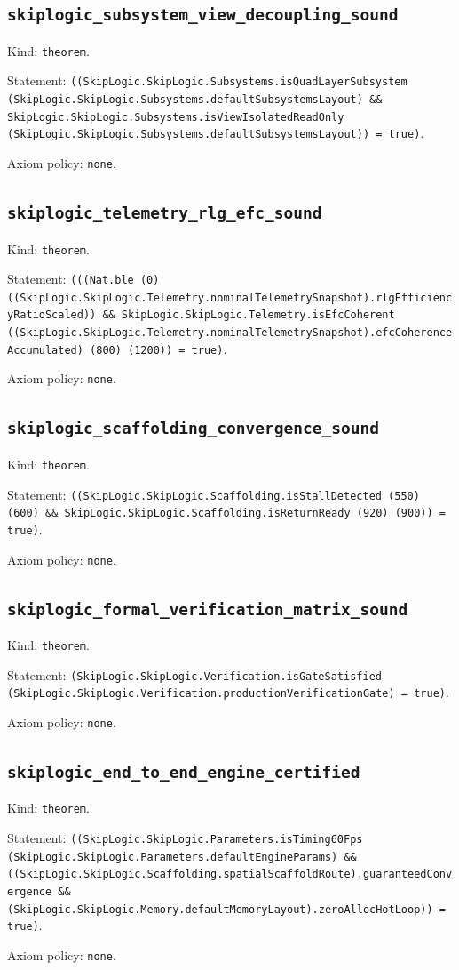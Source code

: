 \documentclass[11pt]{article}
\begin{document}
\subsection*{\texttt{skiplogic\_subsystem\_view\_decoupling\_sound}}
\noindent Kind: \texttt{theorem}.\par
\noindent Statement: \texttt{((SkipLogic.SkipLogic.Subsystems.isQuadLayerSubsystem (SkipLogic.SkipLogic.Subsystems.defaultSubsystemsLayout) \&\& SkipLogic.SkipLogic.Subsystems.isViewIsolatedReadOnly (SkipLogic.SkipLogic.Subsystems.defaultSubsystemsLayout)) = true)}.\par
\noindent Axiom policy: \texttt{none}.\par
\subsection*{\texttt{skiplogic\_telemetry\_rlg\_efc\_sound}}
\noindent Kind: \texttt{theorem}.\par
\noindent Statement: \texttt{(((Nat.ble (0) ((SkipLogic.SkipLogic.Telemetry.nominalTelemetrySnapshot).rlgEfficiencyRatioScaled)) \&\& SkipLogic.SkipLogic.Telemetry.isEfcCoherent ((SkipLogic.SkipLogic.Telemetry.nominalTelemetrySnapshot).efcCoherenceAccumulated) (800) (1200)) = true)}.\par
\noindent Axiom policy: \texttt{none}.\par
\subsection*{\texttt{skiplogic\_scaffolding\_convergence\_sound}}
\noindent Kind: \texttt{theorem}.\par
\noindent Statement: \texttt{((SkipLogic.SkipLogic.Scaffolding.isStallDetected (550) (600) \&\& SkipLogic.SkipLogic.Scaffolding.isReturnReady (920) (900)) = true)}.\par
\noindent Axiom policy: \texttt{none}.\par
\subsection*{\texttt{skiplogic\_formal\_verification\_matrix\_sound}}
\noindent Kind: \texttt{theorem}.\par
\noindent Statement: \texttt{(SkipLogic.SkipLogic.Verification.isGateSatisfied (SkipLogic.SkipLogic.Verification.productionVerificationGate) = true)}.\par
\noindent Axiom policy: \texttt{none}.\par
\subsection*{\texttt{skiplogic\_end\_to\_end\_engine\_certified}}
\noindent Kind: \texttt{theorem}.\par
\noindent Statement: \texttt{((SkipLogic.SkipLogic.Parameters.isTiming60Fps (SkipLogic.SkipLogic.Parameters.defaultEngineParams) \&\& ((SkipLogic.SkipLogic.Scaffolding.spatialScaffoldRoute).guaranteedConvergence \&\& (SkipLogic.SkipLogic.Memory.defaultMemoryLayout).zeroAllocHotLoop)) = true)}.\par
\noindent Axiom policy: \texttt{none}.\par
\end{document}
